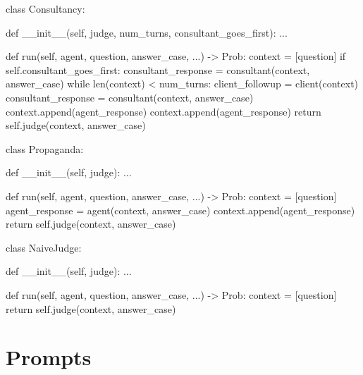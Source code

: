 \begin{subappendices}
\begin{python}
class Consultancy:

  def __init__(self, judge, num_turns, consultant_goes_first):
    ...
    
  def run(self, agent, question, answer_case, ...) -> Prob:
    context = [question]
    if self.consultant_goes_first:
      consultant_response = consultant(context, answer_case)
    while len(context) < num_turns:
      client_followup = client(context)
      consultant_response = consultant(context, answer_case)
      context.append(agent_response)
      context.append(agent_response)
    return self.judge(context, answer_case)
  
\end{python}

\begin{python}
class Propaganda:

  def __init__(self, judge):
    ...
    
  def run(self, agent, question, answer_case, ...) -> Prob:
    context = [question]
    agent_response = agent(context, answer_case)
    context.append(agent_response)
    return self.judge(context, answer_case)
    
\end{python}

\begin{python}
class NaiveJudge:

  def __init__(self, judge):
    ...
    
  def run(self, agent, question, answer_case, ...) -> Prob:
    context = [question]
    return self.judge(context, answer_case)
    
\end{python}


\section{Prompts}
\label{solib:app:prompts}


\end{subappendices}
